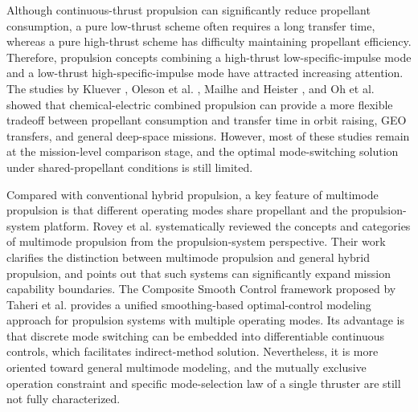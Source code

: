 ﻿\documentclass{IEEEtaes}
\begin{document}
Although continuous-thrust propulsion can significantly reduce propellant consumption, a pure low-thrust scheme often requires a long transfer time, whereas a pure high-thrust scheme has difficulty maintaining propellant efficiency. Therefore, propulsion concepts combining a high-thrust low-specific-impulse mode and a low-thrust high-specific-impulse mode have attracted increasing attention. The studies by Kluever \cite{kluever1995,kluever2012}, Oleson et al. \cite{oleson1997}, Mailhe and Heister \cite{mailhe2002}, and Oh et al. \cite{oh2004} showed that chemical-electric combined propulsion can provide a more flexible tradeoff between propellant consumption and transfer time in orbit raising, GEO transfers, and general deep-space missions. However, most of these studies remain at the mission-level comparison stage, and the optimal mode-switching solution under shared-propellant conditions is still limited.

Compared with conventional hybrid propulsion, a key feature of multimode propulsion is that different operating modes share propellant and the propulsion-system platform. Rovey et al. \cite{rovey2020} systematically reviewed the concepts and categories of multimode propulsion from the propulsion-system perspective. Their work clarifies the distinction between multimode propulsion and general hybrid propulsion, and points out that such systems can significantly expand mission capability boundaries. The Composite Smooth Control framework proposed by Taheri et al. \cite{taheri2020a,taheri2020b} provides a unified smoothing-based optimal-control modeling approach for propulsion systems with multiple operating modes. Its advantage is that discrete mode switching can be embedded into differentiable continuous controls, which facilitates indirect-method solution. Nevertheless, it is more oriented toward general multimode modeling, and the mutually exclusive operation constraint and specific mode-selection law of a single thruster are still not fully characterized.
\end{document}

